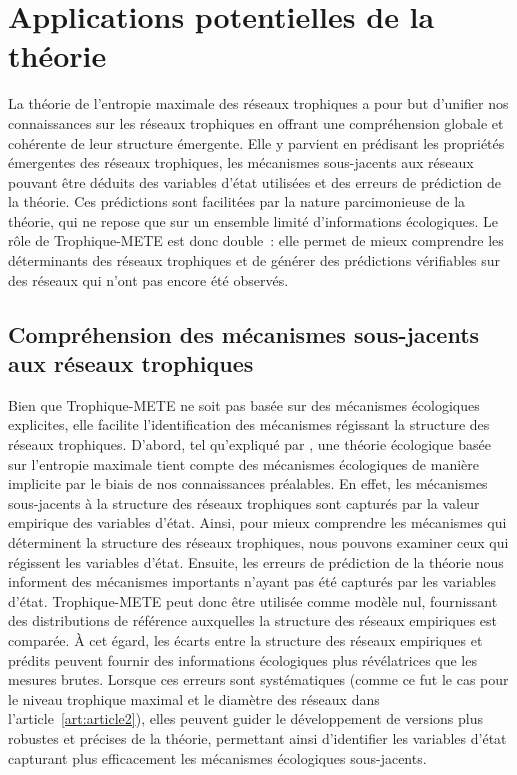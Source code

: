 
\section{Applications potentielles de la théorie} 

La théorie de l'entropie maximale des réseaux trophiques a pour but d'unifier
nos connaissances sur les réseaux trophiques en offrant une compréhension
globale et cohérente de leur structure émergente. Elle y parvient en prédisant
les propriétés émergentes des réseaux trophiques, les mécanismes sous-jacents
aux réseaux pouvant être déduits des variables d'état utilisées et des erreurs
de prédiction de la théorie. Ces prédictions sont facilitées par la nature
parcimonieuse de la théorie, qui ne repose que sur un ensemble limité
d'informations écologiques. Le rôle de Trophique-METE est donc double~: elle
permet de mieux comprendre les déterminants des réseaux trophiques et de générer
des prédictions vérifiables sur des réseaux qui n'ont pas encore été observés.

\subsection{Compréhension des mécanismes sous-jacents aux réseaux trophiques} 

Bien que Trophique-METE ne soit pas basée sur des mécanismes écologiques
explicites, elle facilite l'identification des mécanismes régissant la structure
des réseaux trophiques. D'abord, tel qu'expliqué par
\textcite{Harte2014Maximum}, une théorie écologique basée sur l'entropie
maximale tient compte des mécanismes écologiques de manière implicite par le
biais de nos connaissances préalables. En effet, les mécanismes sous-jacents à
la structure des réseaux trophiques sont capturés par la valeur empirique des
variables d'état. Ainsi, pour mieux comprendre les mécanismes qui déterminent la
structure des réseaux trophiques, nous pouvons examiner ceux qui régissent les
variables d'état. Ensuite, les erreurs de prédiction de la théorie nous
informent des mécanismes importants n'ayant pas été capturés par les variables
d'état. Trophique-METE peut donc être utilisée comme modèle nul, fournissant des
distributions de référence auxquelles la structure des réseaux empiriques est
comparée. À cet égard, les écarts entre la structure des réseaux empiriques et
prédits peuvent fournir des informations écologiques plus révélatrices que les
mesures brutes. Lorsque ces erreurs sont systématiques (comme ce fut le cas pour
le niveau trophique maximal et le diamètre des réseaux dans
l'article~\ref{art:article2}), elles peuvent guider le développement de versions
plus robustes et précises de la théorie, permettant ainsi d'identifier les
variables d'état capturant plus efficacement les mécanismes écologiques
sous-jacents. 

